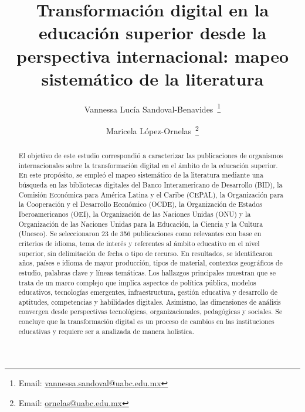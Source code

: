 \documentclass[spanish]{textolivre}
\title{Transformación digital en la educación superior desde la perspectiva internacional: mapeo sistemático de la literatura}
\author[1]{Vannessa Lucía Sandoval-Benavides~\orcid{0000-0002-4233-0142}\thanks{Email: \href{mailto:vannessa.sandoval@uabc.edu.mx}{vannessa.sandoval@uabc.edu.mx}}}
\author[1]{Maricela López-Ornelas~\orcid{0000-0002-4215-5591}\thanks{Email: \href{mailto:ornelas@uabc.edu.mx}{ornelas@uabc.edu.mx}}}
\affil[1]{Universidad Autónoma de Baja California, Instituto de Investigación y Desarrollo Educativo, Ensenada, Baja California, México.}
\begin{document}
\maketitle
\begin{polyabstract}
\begin{abstract}
El objetivo de este estudio correspondió a caracterizar las publicaciones de organismos internacionales sobre la transformación digital en el ámbito de la educación superior. En este propósito, se empleó el mapeo sistemático de la literatura mediante una búsqueda en las bibliotecas digitales del Banco Interamericano de Desarrollo (BID), la Comisión Económica para América Latina y el Caribe (CEPAL), la Organización para la Cooperación y el Desarrollo Económico (OCDE), la Organización de Estados Iberoamericanos (OEI), la Organización de las Naciones Unidas (ONU) y la Organización de las Naciones Unidas para la Educación, la Ciencia y la Cultura (Unesco). Se seleccionaron 23 de 356 publicaciones como relevantes con base en criterios de idioma, tema de interés y referentes al ámbito educativo en el nivel superior, sin delimitación de fecha o tipo de recurso. En resultados, se identificaron años, países e idioma de mayor producción, tipos de material, contextos geográficos de estudio, palabras clave y líneas temáticas. Los hallazgos principales muestran que se trata de un marco complejo que implica aspectos de política pública, modelos educativos, tecnologías emergentes, infraestructura, gestión educativa y desarrollo de aptitudes, competencias y habilidades digitales. Asimismo, las dimensiones de análisis convergen desde perspectivas tecnológicas, organizacionales, pedagógicas y sociales. Se concluye que la transformación digital es un proceso de cambios en las instituciones educativas y requiere ser a analizada de manera holística.

\end{abstract}


\end{polyabstract}
\end{document}
